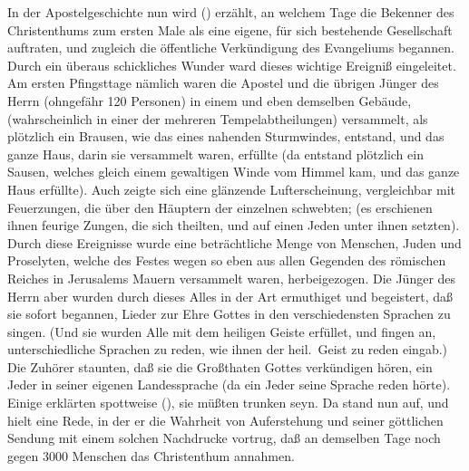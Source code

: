 \begin{aufza}
\item In der Apostelgeschichte nun wird () erzählt, an welchem Tage die Bekenner des Christenthums zum ersten Male als eine eigene, für sich bestehende Gesellschaft auftraten, und zugleich die öffentliche Verkündigung des Evangeliums begannen. Durch ein überaus schickliches Wunder ward dieses wichtige Ereigniß eingeleitet. Am ersten Pfingsttage nämlich waren die Apostel und die übrigen Jünger des Herrn (ohngefähr 120 Personen) in einem und eben demselben Gebäude, (wahrscheinlich in einer der mehreren Tempelabtheilungen) versammelt, als plötzlich ein Brausen, wie das eines nahenden Sturmwindes, entstand, und das ganze Haus, darin sie versammelt waren, erfüllte (da entstand plötzlich ein Sausen, welches gleich einem gewaltigen Winde vom Himmel kam, und das ganze Haus erfüllte). Auch zeigte sich eine glänzende Lufterscheinung, vergleichbar mit Feuerzungen, die über den Häuptern der einzelnen schwebten; (es erschienen ihnen feurige Zungen, die sich theilten, und auf einen Jeden unter ihnen setzten). Durch diese Ereignisse wurde eine beträchtliche Menge von Menschen, Juden und Proselyten, welche des Festes wegen so eben aus allen Gegenden des römischen Reiches in Jerusalems Mauern versammelt waren, herbeigezogen. Die Jünger des Herrn aber wurden durch dieses Alles in der Art ermuthiget und begeistert, daß sie sofort begannen, Lieder zur Ehre Gottes in den verschiedensten Sprachen zu singen. (Und sie wurden Alle mit dem heiligen Geiste erfüllet, und fingen an, unterschiedliche Sprachen zu reden, wie ihnen der heil.\ Geist zu reden eingab.) Die Zuhörer staunten, daß sie die Großthaten Gottes verkündigen hören, ein Jeder in seiner eigenen Landessprache (da ein Jeder seine Sprache reden hörte). Einige erklärten spottweise (), sie müßten trunken seyn. Da stand nun  auf, und hielt eine Rede, in der er die Wahrheit von  Auferstehung und seiner göttlichen Sendung mit einem solchen Nachdrucke vortrug, daß an demselben Tage noch gegen 3000 Menschen das Christenthum annahmen.

\end{aufza}
